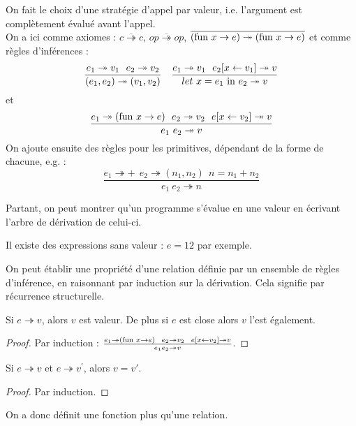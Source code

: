 \documentclass{cours}
\newcommand*{\rrarrow}{\twoheadrightarrow}
\newcommand*{\fun}[2]{\textmd{fun } #1 \rightarrow #2}
\begin{document}
On fait le choix d'une stratégie d'appel par valeur, i.e. l'argument est complètement évalué avant l'appel. \\
On a ici comme axiomes : $\overline{c \twoheadrightarrow c}$, $\overline{op \twoheadrightarrow op}$, $\overline{(\textmd{fun } x \rightarrow e) \twoheadrightarrow (\fun{x}{e})}$
et comme règles d'inférences : 
\[    
    \frac{e_{1} \twoheadrightarrow v_{1} \ \ e_{2} \twoheadrightarrow v_{2}}{(e_{1}, e_{2}) \twoheadrightarrow (v_{1}, v_{2})} \ \ \ \frac{e_{1} \twoheadrightarrow v_{1} \ \ e_{2}[x \leftarrow v_{1}] \twoheadrightarrow v}{let\ x  = e_{1} \textmd{ in } e_{2} \twoheadrightarrow v}
\]
et 
\[
  \frac{e_{1}\rrarrow(\fun{x}{e})\ \ e_{2} \rrarrow v_{2} \ \ e[x \leftarrow v_{2}] \rrarrow v}{e_{1}\ e_{2} \rrarrow v}
\]
On ajoute ensuite des règles pour les primitives, dépendant de la forme de chacune, e.g. : 
\[
  \frac{e_{1} \rrarrow + \ \ e_{2} \rrarrow (n_{1}, n_{2})\ \ n = n_{1} + n_{2}}{e_{1}\ e_{2} \rrarrow n}  
\]

Partant, on peut montrer qu'un programme s'évalue en une valeur en écrivant l'arbre de dérivation de celui-ci. \\
\begin{remark}
    Il existe des expressions sans valeur : $e = 1 2$ par exemple.
\end{remark}

On peut établir une propriété d'une relation définie par un ensemble de règles d'inférence, en raisonnant par induction sur la dérivation. Cela signifie par récurrence structurelle.
\begin{proposition}
    Si $e\twoheadrightarrow v$, alors $v$ est valeur. De plus si $e$ est close alors $v$ l'est également.
\end{proposition}
\begin{proof}
    Par induction : $\frac{e_{1} \twoheadrightarrow (\fun{x}{e}) \ \ e_{2} \twoheadrightarrow v_{2} \ \ e[x \leftarrow v_{2}] \twoheadrightarrow v}{e_{1} e_{2} \twoheadrightarrow v}$.
\end{proof}
\begin{proposition}
    Si $e \twoheadrightarrow v$ et $e \twoheadrightarrow v^{'}$, alors $v = v'$.
\end{proposition}
\begin{proof}
    Par induction. 
\end{proof}
\begin{remark}
    On a donc définit une fonction plus qu'une relation. 
\end{remark}
\end{document}
